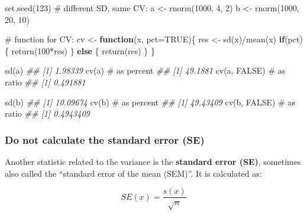 \documentclass[
  13,
  letterpaper,
]{report}
\newenvironment{Shaded}{\begin{snugshade}}{\end{snugshade}}
\newcommand{\AttributeTok}[1]{\textcolor[rgb]{0.40,0.45,0.13}{#1}}
\newcommand{\CommentTok}[1]{\textcolor[rgb]{0.37,0.37,0.37}{#1}}
\newcommand{\ConstantTok}[1]{\textcolor[rgb]{0.56,0.35,0.01}{#1}}
\newcommand{\ControlFlowTok}[1]{\textcolor[rgb]{0.00,0.23,0.31}{\textbf{#1}}}
\newcommand{\DecValTok}[1]{\textcolor[rgb]{0.68,0.00,0.00}{#1}}
\newcommand{\DocumentationTok}[1]{\textcolor[rgb]{0.37,0.37,0.37}{\textit{#1}}}
\newcommand{\FunctionTok}[1]{\textcolor[rgb]{0.28,0.35,0.67}{#1}}
\newcommand{\NormalTok}[1]{\textcolor[rgb]{0.00,0.23,0.31}{#1}}
\newcommand{\OtherTok}[1]{\textcolor[rgb]{0.00,0.23,0.31}{#1}}
\newcommand{\SpecialCharTok}[1]{\textcolor[rgb]{0.37,0.37,0.37}{#1}}
\begin{document}
\begin{Shaded}
\begin{Highlighting}[]

\FunctionTok{set.seed}\NormalTok{(}\DecValTok{123}\NormalTok{)}
\CommentTok{\# different SD, same CV:}
\NormalTok{a }\OtherTok{\textless{}{-}} \FunctionTok{rnorm}\NormalTok{(}\DecValTok{1000}\NormalTok{, }\DecValTok{4}\NormalTok{, }\DecValTok{2}\NormalTok{)}
\NormalTok{b }\OtherTok{\textless{}{-}} \FunctionTok{rnorm}\NormalTok{(}\DecValTok{1000}\NormalTok{, }\DecValTok{20}\NormalTok{, }\DecValTok{10}\NormalTok{)}

\CommentTok{\# function for CV:}
\NormalTok{cv }\OtherTok{\textless{}{-}} \ControlFlowTok{function}\NormalTok{(x, }\AttributeTok{pct=}\ConstantTok{TRUE}\NormalTok{)\{}
\NormalTok{    res }\OtherTok{\textless{}{-}} \FunctionTok{sd}\NormalTok{(x)}\SpecialCharTok{/}\FunctionTok{mean}\NormalTok{(x)}
    \ControlFlowTok{if}\NormalTok{(pct)\{}
        \FunctionTok{return}\NormalTok{(}\DecValTok{100}\SpecialCharTok{*}\NormalTok{res)}
\NormalTok{    \} }\ControlFlowTok{else}\NormalTok{ \{}
        \FunctionTok{return}\NormalTok{(res)}
\NormalTok{    \}}
\NormalTok{\}}

\FunctionTok{sd}\NormalTok{(a)}
\DocumentationTok{\#\# [1] 1.98339}
\FunctionTok{cv}\NormalTok{(a)        }\CommentTok{\# as percent}
\DocumentationTok{\#\# [1] 49.1881}
\FunctionTok{cv}\NormalTok{(a, }\ConstantTok{FALSE}\NormalTok{) }\CommentTok{\# as ratio}
\DocumentationTok{\#\# [1] 0.491881}

\FunctionTok{sd}\NormalTok{(b)}
\DocumentationTok{\#\# [1] 10.09674}
\FunctionTok{cv}\NormalTok{(b)        }\CommentTok{\# as percent}
\DocumentationTok{\#\# [1] 49.43409}
\FunctionTok{cv}\NormalTok{(b, }\ConstantTok{FALSE}\NormalTok{) }\CommentTok{\# as ratio}
\DocumentationTok{\#\# [1] 0.4943409}
\end{Highlighting}
\end{Shaded}

\subsubsection{Do not calculate the standard error
(SE)}\label{sec-desc-var-var-se}

Another statistic related to the variance is the \textbf{standard error
(SE)}, sometimes also called the ``standard error of the mean (SEM)''.
It is calculated as:

\[SE\left(x\right)=\frac{s\left(x\right)}{\sqrt{n}}\]
\end{document}

